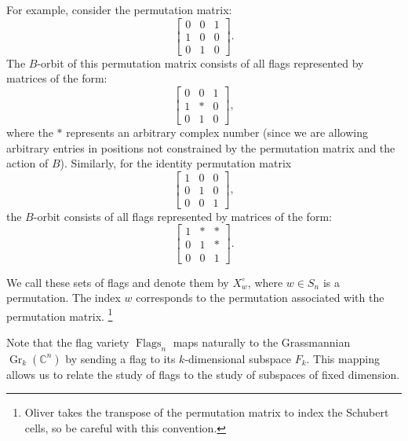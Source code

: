 For example, consider the permutation matrix:
\begin{equation}
    \begin{bmatrix}
        0 & 0 & 1 \\
        1 & 0 & 0 \\
        0 & 1 & 0
    \end{bmatrix}.
\end{equation}
The \(B\)-orbit of this permutation matrix consists of all flags represented by matrices of the form:
\begin{equation}
    \begin{bmatrix}
        0 & 0 & 1 \\
        1 & \ast & 0 \\
        0 & 1 & 0
    \end{bmatrix},
\end{equation}
where the \(\ast\) represents an arbitrary complex number (since we are allowing arbitrary entries in positions not constrained by the permutation matrix and the action of \(B\)).
Similarly, for the identity permutation matrix
\begin{equation}
    \begin{bmatrix}
        1 & 0 & 0 \\
        0 & 1 & 0 \\
        0 & 0 & 1
    \end{bmatrix},
\end{equation}
the \(B\)-orbit consists of all flags represented by matrices of the form:
\begin{equation}
    \begin{bmatrix}
        1 & \ast & \ast \\
        0 & 1 & \ast \\
        0 & 0 & 1
    \end{bmatrix}.
\end{equation}

We call these sets of flags  and denote them by \(X_w^\circ\), where \(w \in S_n\) is a permutation.
The index \(w\) corresponds to the permutation associated with the permutation matrix.%
\footnote{Oliver takes the transpose of the permutation matrix to index the Schubert cells, so be careful with this convention.}

Note that the flag variety \(\operatorname{Flags}_n\) maps naturally to the Grassmannian \(\operatorname{Gr}_k(\mathbb{C}^n)\) by sending a flag to its \(k\)-dimensional subspace \(F_k\).
This mapping allows us to relate the study of flags to the study of subspaces of fixed dimension.

